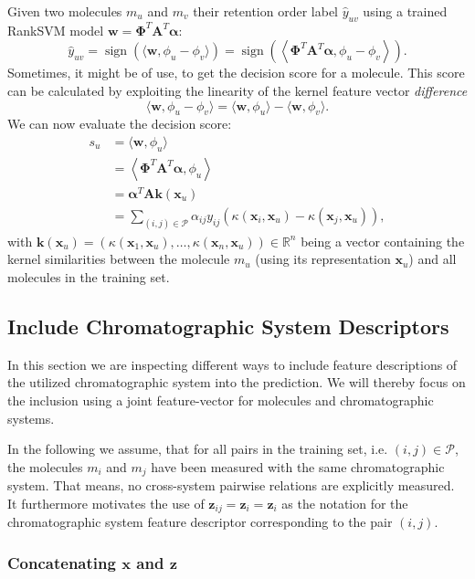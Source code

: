 \documentclass[10p]{article}
\newcommand{\balpha}{\boldsymbol{\alpha}}
\newcommand{\numexp}{n}
\newcommand{\x}{\mathbf{x}}
\newcommand{\z}{\mathbf{z}}
\newcommand{\Pset}{\mathcal{P}}
\newcommand{\w}{\mathbf{w}}
\newcommand{\bPhi}{\boldsymbol{\Phi}}
\newcommand{\A}{\mathbf{A}}
\newcommand{\molkern}{\kappa}
\newcommand{\bmolkern}{\mathbf{k}}
\DeclareMathOperator{\sign}{sign}
\begin{document}
Given two molecules $m_u$ and $m_v$ their retention order label $\hat{y}_{uv}$ using a trained RankSVM model $\w=\bPhi^T\A^T\balpha$:
\begin{equation}
    \hat{y}_{uv}
        =\sign(\langle\w,\phi_u-\phi_v\rangle)
        =\sign\left(\left\langle\bPhi^T\A^T\balpha,\phi_u-\phi_v\right\rangle\right).
\end{equation}
Sometimes, it might be of use, to get the decision score for a molecule. This score can be calculated by exploiting the linearity of the kernel feature vector \emph{difference}
\begin{equation}
    \langle\w,\phi_u-\phi_v\rangle=\langle\w,\phi_u\rangle-\langle\w,\phi_v\rangle.
\end{equation}
We can now evaluate the decision score: 
\begin{align}
    s_u
        &=\langle\w,\phi_u\rangle\\
        &=\left\langle\bPhi^T\A^T\balpha,\phi_u\right\rangle\\
        &=\balpha^T\A\bmolkern(\x_u)\\
        &=\sum_{(i,j)\in\Pset}\alpha_{ij}y_{ij}\left(\molkern(\x_i,\x_u)-\molkern(\x_j,\x_u)\right),
\end{align}
with $\bmolkern(\x_u)=(\molkern(\x_1,\x_u),\ldots,\molkern(\x_\numexp,\x_u))\in\mathbb{R}^{\numexp}$ being a vector containing the kernel similarities between the molecule $m_u$ (using its representation $\x_u$) and all molecules in the training set. 

\subsection{Include Chromatographic System Descriptors}

In this section we are inspecting different ways to include feature descriptions of the utilized chromatographic system into the prediction. We will thereby focus on the inclusion using a joint feature-vector for molecules and chromatographic systems. 

In the following we assume, that for all pairs in the training set, i.e. $(i,j)\in\Pset$, the molecules $m_i$ and $m_j$ have been measured with the same chromatographic system. That means, no cross-system pairwise relations are explicitly measured. It furthermore motivates the use of $\z_{ij}=\z_i=\z_i$ as the notation for the chromatographic system feature descriptor corresponding to the pair $(i,j)$. 

\subsubsection{Concatenating $\x$ and $\z$}
\end{document}
